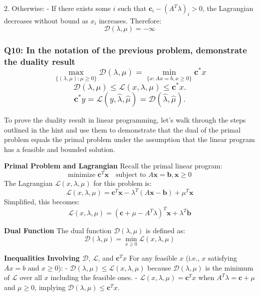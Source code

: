 \documentclass[8pt]{article}
\begin{document}
2. Otherwise:
    - If there exists some \(i\) such that \(\mathbf{c}_i - (A^T \lambda)_i > 0\), the Lagrangian decreases without bound as \(x_i\) increases. Therefore:
    \[
    \mathcal{D}(\lambda, \mu) = -\infty
    \]

\subsubsection*{Q10: In the notation of the previous problem, demonstrate the duality result
\[
\max_{\{(\lambda, \mu) : \mu \geq 0\}} \mathcal{D}(\lambda, \mu) = \min_{\{x : A x = b, x \geq 0\}} \mathbf{c}^* x
\]
\[
\mathcal{D}(\lambda, \mu) \leq \mathcal{L}(x, \lambda, \mu) \leq \mathbf{c}^* x.
\]
\[
\mathbf{c}^* y = \mathcal{L}(y, \hat{\lambda}, \hat{\mu}) = \mathcal{D}(\hat{\lambda}, \hat{\mu}).
\]}

To prove the duality result in linear programming, let's walk through the steps outlined in the hint and use them to demonstrate that the dual of the primal problem equals the primal problem under the assumption that the linear program has a feasible and bounded solution.

\textbf{Primal Problem and Lagrangian}
Recall the primal linear program:
\[
\text{minimize } \mathbf{c}^T \mathbf{x} \quad \text{subject to } A \mathbf{x} = \mathbf{b}, \mathbf{x} \geq 0
\]
The Lagrangian \(\mathcal{L}(x, \lambda, \mu)\) for this problem is:
\[
\mathcal{L}(x, \lambda, \mu) = \mathbf{c}^T \mathbf{x} - \lambda^T (A\mathbf{x} - \mathbf{b}) + \mu^T \mathbf{x}
\]
Simplified, this becomes:
\[
\mathcal{L}(x, \lambda, \mu) = (\mathbf{c} + \mu - A^T \lambda)^T \mathbf{x} + \lambda^T \mathbf{b}
\]

\textbf{Dual Function}
The dual function \(\mathcal{D}(\lambda, \mu)\) is defined as:
\[
\mathcal{D}(\lambda, \mu) = \min_{x \geq 0} \mathcal{L}(x, \lambda, \mu)
\]

\textbf{Inequalities Involving \(\mathcal{D}\)}, \(\mathcal{L}\), and \(\mathbf{c}^T x\)
For any feasible \(x\) (i.e., \(x\) satisfying \(Ax = b\) and \(x \geq 0\)):
- \(\mathcal{D}(\lambda, \mu) \leq \mathcal{L}(x, \lambda, \mu)\) because \(\mathcal{D}(\lambda, \mu)\) is the minimum of \(\mathcal{L}\) over all \(x\) including the feasible ones.
- \(\mathcal{L}(x, \lambda, \mu) = \mathbf{c}^T x\) when \(A^T \lambda = \mathbf{c} + \mu\) and \(\mu \geq 0\), implying \(\mathcal{D}(\lambda, \mu) \leq \mathbf{c}^T x\).
\end{document}
